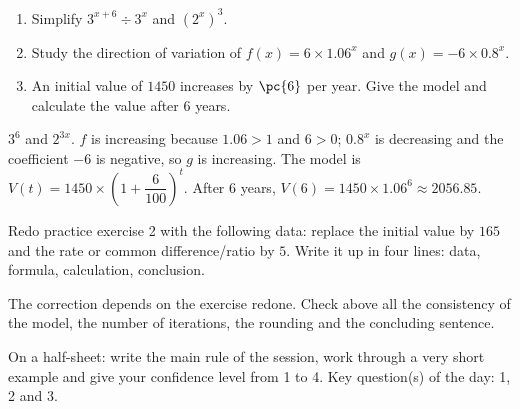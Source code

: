 \begin{exercise}[essential]
\begin{enumerate}\item Simplify $3^{x+6}\div3^x$ and $(2^x)^3$.\item Study the direction of variation of $f(x)=6\times\num{1,06}^x$ and $g(x)=-6\times\num{0,8}^x$.\item An initial value of $1450$ increases by $\pc{6}$ per year. Give the model and calculate the value after $6$ years.\end{enumerate}
\end{exercise}
\begin{solution}$3^6$ and $2^{3x}$. $f$ is increasing because $\num{1,06}>1$ and $6>0$; $\num{0,8}^x$ is decreasing and the coefficient $-6$ is negative, so $g$ is increasing. The model is $V(t)=1450\times\left(1+\dfrac{6}{100}\right)^t$. After $6$ years, $V(6)=1450\times\num{1,06}^6\approx\num{2056,85}$.\end{solution}


\begin{homework}Redo practice exercise 2 with the following data: replace the initial value by $165$ and the rate or common difference/ratio by $5$. Write it up in four lines: data, formula, calculation, conclusion.\end{homework}
\begin{solution}The correction depends on the exercise redone. Check above all the consistency of the model, the number of iterations, the rounding and the concluding sentence.\end{solution}

\begin{exitticket}[3 minutes]On a half-sheet: write the main rule of the session, work through a very short example and give your confidence level from 1 to 4. Key question(s) of the day: 1, 2 and 3.\end{exitticket}


